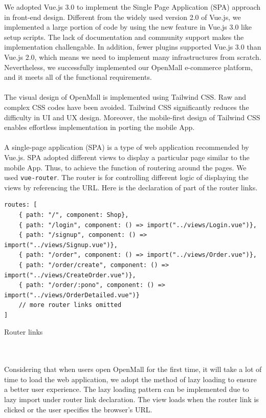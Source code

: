 \documentclass{article}
\begin{document}
We adopted Vue.js 3.0 to implement the Single Page Application (SPA) \cite{spa} approach in front-end design. Different from the widely used version 2.0 of Vue.js, we implemented a large portion of code by using the new feature in Vue.js 3.0 like setup scripts. The lack of documentation and community support makes the implementation challengable. In addition, fewer plugins supported Vue.js 3.0 than Vue.js 2.0, which means we need to implement many infrastructures from scratch. Nevertheless, we successfully implemented our OpenMall e-commerce platform, and it meets all of the functional requirements.
\\\\
The visual design of OpenMall is implemented using Tailwind CSS. Raw and complex CSS codes have been avoided. Tailwind CSS significantly reduces the difficulty in UI and UX design. Moreover, the mobile-first design of Tailwind CSS enables effortless implementation in porting the mobile App.
\\\\
A single-page application (SPA) is a type of web application recommended by Vue.js. SPA adopted different views to display a particular page similar to the mobile App. Thus, to achieve the function of routering around the pages. We used \verb|vue-router|. The router is for controlling different logic of displaying the views by referencing the URL. Here is the declaration of part of the router links. 
\begin{listing}[!htp]
\begin{verbatim}
routes: [
    { path: "/", component: Shop},
    { path: "/login", component: () => import("../views/Login.vue")},
    { path: "/signup", component: () => import("../views/Signup.vue")},
    { path: "/order", component: () => import("../views/Order.vue")},
    { path: "/order/create", component: () => import("../views/CreateOrder.vue")},
    { path: "/order/:pono", component: () => import("../views/OrderDetailed.vue")}
    // more router links omitted
]
\end{verbatim}
\caption{Router links}
 
\end{listing}
\leavevmode
\\\\
Considering that when users open OpenMall for the first time, it will take a lot of time to load the web application, we adopt the method of lazy loading to ensure a better user experience. The lazy loading pattern can be implemented due to lazy import under router link declaration. The view loads when the router link is clicked or the user specifies the browser's URL.
\end{document}
